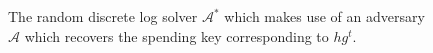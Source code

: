 \begin{figure}[t]
\begin{algorithm}[H]
    \caption{\label{alg.secret-key-adversary}
    The random discrete log solver $\mathcal{A}^*$
    which makes use of an adversary $\mathcal{A}$ which
    recovers the spending key corresponding to $h g^t$.}
    \begin{algorithmic}[1]
            \State{}
        \EndFunction
    \end{algorithmic}
\end{algorithm}
\end{figure}
